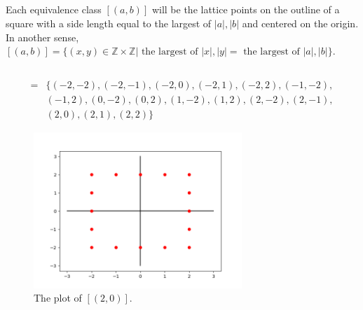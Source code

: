 \documentclass{article}
\begin{document}
\subsection{}
Each equivalence class $[(a,b)]$ will be the lattice points on the outline of a square with a side length equal to the largest of $|a|,|b|$ and centered on the origin.\\
In another sense, $[(a,b)] = \{ (x,y) \in \mathbb{Z} \times \mathbb{Z} | \text{ the largest of } |x|,|y| = \text{ the largest of } |a|,|b| \}$.

\subsection{}
\begin{align*}
    [2,0] = &\{(-2, -2), (-2, -1), (-2, 0), (-2, 1), (-2, 2), (-1, -2),\\
          &(-1, 2), (0, -2), (0, 2), (1, -2), (1, 2), (2, -2), (2, -1),\\
          &(2, 0), (2, 1), (2, 2)\}
\end{align*}
\begin{figure}[hbt!]
    \centering
    \includegraphics[width=0.7\textwidth]{plot.png}
    \caption{The plot of $[(2,0)]$.}
\end{figure}
\FloatBarrier
\end{document}
